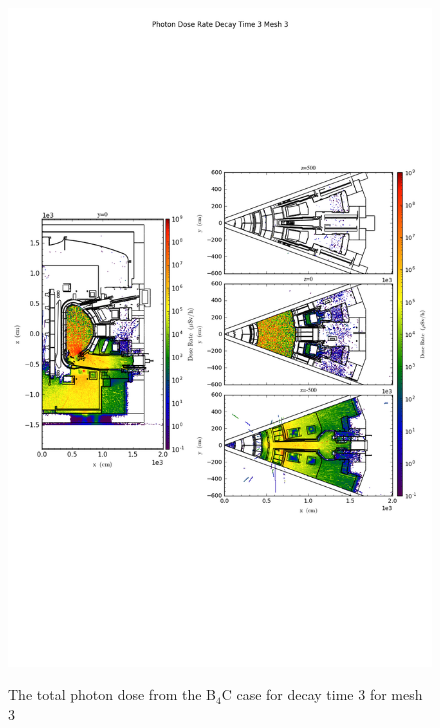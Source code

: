 \begin{figure}[ht!]
\centering
\includegraphics[trim={0cm 9cm 0cm 10cm},clip,scale=0.75]{../plots/final_model_with_b4c/Photon_Dose_Rate_Decay_Time_3_Mesh_3.png}
\label{fig:photons_dc3_no4bc_m3_flux}
\caption{The total photon dose from the B$_4$C case for decay time 3 for mesh 3}
\end{figure}
